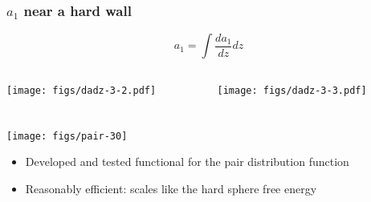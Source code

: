 \begin{frame}
  \frametitle{$a_1$ near a hard wall}
  \[ a_1 = \int \frac{da_1}{dz} dz \]
  \vspace{-3em}
  \begin{columns}
    \begin{column}{0.5\columnwidth}
      \begin{center}
        \texttt{[image: figs/dadz-3-2.pdf]}
      \end{center}
    \end{column}
    \begin{column}{0.5\columnwidth}
      \begin{center}
        \texttt{[image: figs/dadz-3-3.pdf]}
      \end{center}
    \end{column}
  \end{columns}
\end{frame}

\begin{frame}
  \frametitle{\conclude}
  \begin{center}
    \texttt{[image: figs/pair-30]}
  \end{center}
  \begin{itemize}
  \item Developed and tested functional for the pair distribution
    function
  \item Reasonably efficient: scales like the hard sphere free energy
  \end{itemize}
\end{frame}

